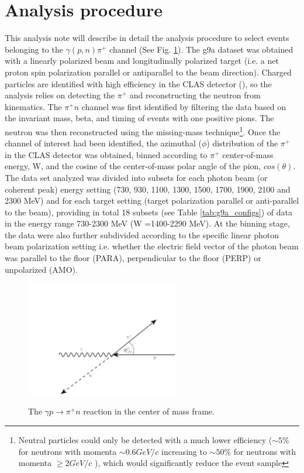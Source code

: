\section{Analysis procedure}
This analysis note will describe in detail the analysis procedure to select events belonging to the $\gamma (p,n) \pi^+$ channel (See Fig. \ref{fig:frost_diagram}). The g9a dataset was obtained with a linearly polarized beam and longitudinally polarized target (i.e. a net proton spin polarization parallel or antiparallel to the beam direction). Charged particles are identified with high efficiency in the CLAS detector (\cite{Mecking2003}), so the analysis relies on detecting the $\pi^+$ and reconstructing the neutron from kinematics. The $\pi^+ n$ channel was first identified by filtering the data based on the invariant mass, beta, and timing of events with one  positive pions. The neutron was then reconstructed using the missing-mass technique\footnote{Neutral particles could only be detected with a much lower efficiency ($\sim5\%$ for neutrons with momenta $\sim 0.6 GeV/c$ increasing to $\sim 50\%$ for neutrons with momenta $\geq2 GeV/c$  \cite{Mecking2003}), which would significantly reduce the event sample}. Once the channel of interest had been identified, the azimuthal ($\phi$) distribution of the $\pi^+$ in the CLAS detector was obtained, binned according to $\pi^+$ center-of-mass energy, W, and the cosine of the center-of-mass polar angle of the pion, $cos(\theta)$. The data set analyzed  was divided into subsets for each photon beam (or coherent peak) energy setting (730, 930, 1100, 1300, 1500, 1700, 1900, 2100 and 2300 MeV) and for each target setting (target polarization parallel or anti-parallel to the beam), providing in total 18 subsets (see Table \ref{tab:g9a_configs}) of data in the energy range 730-2300 MeV (W =1400-2290 MeV). At the binning stage, the data were also further subdivided according to the specific linear photon beam polarization setting i.e. whether the electric field vector of the photon beam was parallel to the floor (PARA), perpendicular to the floor (PERP) or unpolarized (AMO). 
\begin{figure}[htb]
  \begin{center}
    \includegraphics[width=0.6\textwidth]{figures/frost_reaction.pdf} \\
    \caption{The $\gamma p \rightarrow \pi^+ n $ reaction in the center of mass frame. }
    \label{fig:frost_diagram}
  \end{center}
\end{figure}

